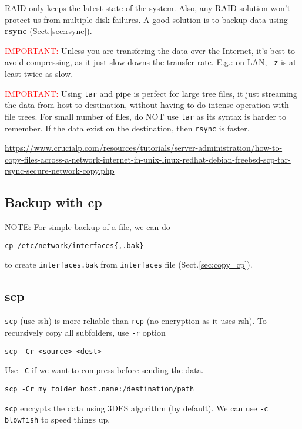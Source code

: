 RAID only keeps the latest state of the system. Also, any RAID solution won't
protect us from multiple disk failures. A good solution is to backup data using
{\bf rsync} (Sect.\ref{sec:rsync}).

\textcolor{red}{IMPORTANT:} Unless you are transfering the data over the
Internet, it's best to avoid compressing, as it just slow downs the transfer
rate. E.g.: on LAN, \verb!-z! is at least twice as slow.

\textcolor{red}{IMPORTANT:} Using \verb!tar! and pipe is perfect for large tree
files, it just streaming the data from host to destination, without having to do
intense operation with file trees. For small number of files, do NOT use
\verb!tar! as its syntax is harder to remember. If the data exist on the
destination, then \verb!rsync! is faster.

\url{https://www.crucialp.com/resources/tutorials/server-administration/how-to-copy-files-across-a-network-internet-in-unix-linux-redhat-debian-freebsd-scp-tar-rsync-secure-network-copy.php}

\subsection{Backup with cp}

NOTE: For simple backup of a file, we can do
\begin{verbatim}
cp /etc/network/interfaces{,.bak}
\end{verbatim}
to create \verb!interfaces.bak! from \verb!interfaces! file
(Sect.\ref{sec:copy_cp}).


\subsection{scp}

\verb!scp! (use ssh) is more reliable than \verb!rcp! (no encryption as it uses
rsh). To recursively copy all subfolders, use \verb!-r! option
\begin{verbatim}
scp -Cr <source> <dest>
\end{verbatim}
Use \verb!-C! if we want to compress before sending the data.

\begin{verbatim}
scp -Cr my_folder host.name:/destination/path
\end{verbatim}

\verb!scp! encrypts the data using 3DES algorithm (by default). We can use
\verb!-c blowfish! to speed things up. 

